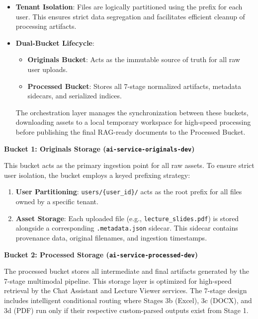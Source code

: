 \begin{itemize}
    \item \textbf{Tenant Isolation}: Files are logically partitioned using the prefix for each user. This ensures strict data segregation and facilitates efficient cleanup of processing artifacts.
    \item \textbf{Dual-Bucket Lifecycle}: 
    \begin{itemize}
        \item \textbf{Originals Bucket}: Acts as the immutable source of truth for all raw user uploads.
        \item \textbf{Processed Bucket}: Stores all 7-stage normalized artifacts, metadata sidecars, and serialized indices. 
    \end{itemize}
    The orchestration layer manages the synchronization between these buckets, downloading assets to a local temporary workspace for high-speed processing before publishing the final RAG-ready documents to the Processed Bucket.
\end{itemize}

\textbf{Bucket 1: Originals Storage (\texttt{ai-service-originals-dev})}

This bucket acts as the primary ingestion point for all raw assets. To ensure strict user isolation, the bucket employs a keyed prefixing strategy:
\begin{enumerate}
    \item \textbf{User Partitioning}: \texttt{users/\{user\_id\}/} acts as the root prefix for all files owned by a specific tenant.
    \item \textbf{Asset Storage}: Each uploaded file (e.g., \texttt{lecture\_slides.pdf}) is stored alongside a corresponding \texttt{.metadata.json} sidecar. This sidecar contains provenance data, original filenames, and ingestion timestamps.
\end{enumerate}

\textbf{Bucket 2: Processed Storage (\texttt{ai-service-processed-dev})}

The processed bucket stores all intermediate and final artifacts generated by the 7-stage multimodal pipeline. This storage layer is optimized for high-speed retrieval by the Chat Assistant and Lecture Viewer services. The 7-stage design includes intelligent conditional routing where Stages 3b (Excel), 3c (DOCX), and 3d (PDF) run only if their respective custom-parsed outputs exist from Stage 1.

